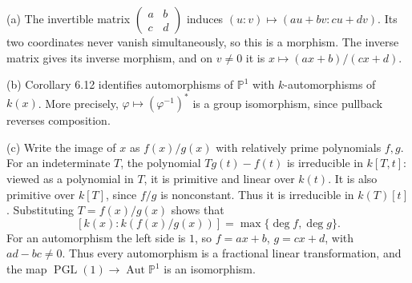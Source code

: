 (a) The invertible matrix $\begin{pmatrix}a&b\\c&d\end{pmatrix}$ induces $(u:v)\mapsto(au+bv:cu+dv)$. Its two coordinates never vanish simultaneously, so this is a morphism. The inverse matrix gives its inverse morphism, and on $v\ne0$ it is $x\mapsto(ax+b)/(cx+d)$.

(b) Corollary 6.12 identifies automorphisms of $\mathbb{P}^1$ with $k$-automorphisms of $k(x)$. More precisely, $\varphi\mapsto(\varphi^{-1})^*$ is a group isomorphism, since pullback reverses composition.

(c) Write the image of $x$ as $f(x)/g(x)$ with relatively prime polynomials $f,g$. For an indeterminate $T$, the polynomial $Tg(t)-f(t)$ is irreducible in $k[T,t]$: viewed as a polynomial in $T$, it is primitive and linear over $k(t)$. It is also primitive over $k[T]$, since $f/g$ is nonconstant. Thus it is irreducible in $k(T)[t]$. Substituting $T=f(x)/g(x)$ shows that
\[[k(x):k(f(x)/g(x))]=\max\{\deg f,\deg g\}.\]
For an automorphism the left side is $1$, so $f=ax+b$, $g=cx+d$, with $ad-bc\ne0$. Thus every automorphism is a fractional linear transformation, and the map $\operatorname{PGL}(1)\to\operatorname{Aut}\mathbb{P}^1$ is an isomorphism.
